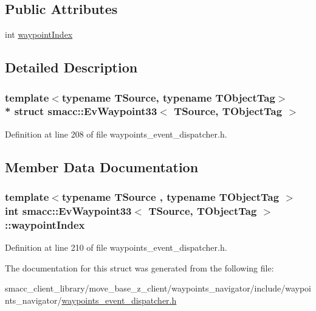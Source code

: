 \subsection*{Public Attributes}
\begin{DoxyCompactItemize}
\item 
int \hyperlink{structsmacc_1_1EvWaypoint33_ae1c3a3ed46321664fef374b3bb68aba2}{waypoint\+Index}
\end{DoxyCompactItemize}


\subsection{Detailed Description}
\subsubsection*{template$<$typename T\+Source, typename T\+Object\+Tag$>$\\*
struct smacc\+::\+Ev\+Waypoint33$<$ T\+Source, T\+Object\+Tag $>$}



Definition at line 208 of file waypoints\+\_\+event\+\_\+dispatcher.\+h.



\subsection{Member Data Documentation}
\subsubsection[{\texorpdfstring{waypoint\+Index}{waypointIndex}}]{\setlength{\rightskip}{0pt plus 5cm}template$<$typename T\+Source , typename T\+Object\+Tag $>$ int {\bf smacc\+::\+Ev\+Waypoint33}$<$ T\+Source, T\+Object\+Tag $>$\+::waypoint\+Index}\hypertarget{structsmacc_1_1EvWaypoint33_ae1c3a3ed46321664fef374b3bb68aba2}{}\label{structsmacc_1_1EvWaypoint33_ae1c3a3ed46321664fef374b3bb68aba2}


Definition at line 210 of file waypoints\+\_\+event\+\_\+dispatcher.\+h.



The documentation for this struct was generated from the following file\+:\begin{DoxyCompactItemize}
\item 
smacc\+\_\+client\+\_\+library/move\+\_\+base\+\_\+z\+\_\+client/waypoints\+\_\+navigator/include/waypoints\+\_\+navigator/\hyperlink{waypoints__event__dispatcher_8h}{waypoints\+\_\+event\+\_\+dispatcher.\+h}\end{DoxyCompactItemize}
